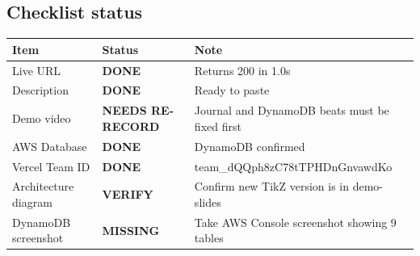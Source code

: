 \subsection{Checklist status}

\begin{center}
\begin{tabular}{lll}
\toprule
Item & Status & Note \\
\midrule
Live URL & \textcolor{okgreen}{\textbf{DONE}} & Returns 200 in 1.0s \\
Description & \textcolor{okgreen}{\textbf{DONE}} & Ready to paste \\
Demo video & \textcolor{P1amber}{\textbf{NEEDS RE-RECORD}} & Journal and DynamoDB beats must be fixed first \\
AWS Database & \textcolor{okgreen}{\textbf{DONE}} & DynamoDB confirmed \\
Vercel Team ID & \textcolor{okgreen}{\textbf{DONE}} & team\_dQQph8zC78tTPHDnGnvawdKo \\
Architecture diagram & \textcolor{P0red}{\textbf{VERIFY}} & Confirm new TikZ version is in demo-slides \\
DynamoDB screenshot & \textcolor{P0red}{\textbf{MISSING}} & Take AWS Console screenshot showing 9 tables \\
\bottomrule
\end{tabular}
\end{center}
